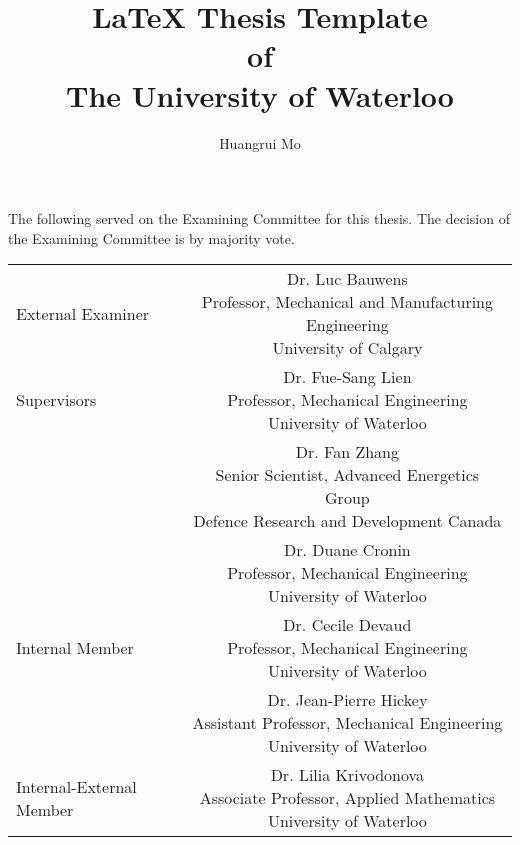 \title[\LaTeX{} Thesis Template of UW]{\LaTeX{} Thesis Template\\ of\\ The University of Waterloo}%
\author{Huangrui Mo}
\maketitle
\begin{committee}
    \noindent
    The following served on the Examining Committee for this thesis. The decision of the Examining Committee is by majority vote.

    \begin{center}
        \setlength{\tabcolsep}{10pt}%
        \renewcommand{\arraystretch}{3}%
        \begin{tabular}{lc}
            External Examiner & \parbox[t]{10cm}{Dr. Luc Bauwens\\Professor, Mechanical and Manufacturing Engineering\\University of 
Calgary}\\
            Supervisors & \parbox[t]{10cm}{Dr. Fue-Sang Lien\\Professor, Mechanical Engineering\\University of Waterloo}\\
             & \parbox[t]{10cm}{Dr. Fan Zhang\\Senior Scientist, Advanced Energetics Group\\Defence Research and Development Canada}\\
             & \parbox[t]{10cm}{Dr. Duane Cronin\\Professor, Mechanical Engineering\\University of Waterloo}\\
            Internal Member & \parbox[t]{10cm}{Dr. Cecile Devaud\\Professor, Mechanical Engineering\\University of Waterloo}\\
             & \parbox[t]{10cm}{Dr. Jean-Pierre Hickey\\Assistant Professor, Mechanical Engineering\\University of Waterloo}\\
            Internal-External Member & \parbox[t]{10cm}{Dr. Lilia Krivodonova\\Associate Professor, Applied Mathematics\\University of Waterloo}\\
        \end{tabular}
    \end{center}
\end{committee}
